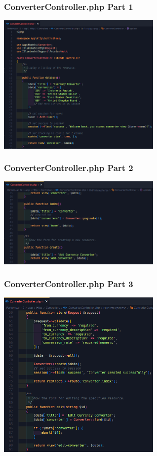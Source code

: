 \documentclass[aspectratio=169, table]{beamer}
\begin{document}
\begin{frame}[fragile]
 \frametitle{ConverterController.php Part 1}
 \vskip1cm
 \begin{center}
  \includegraphics[width=0.6\textwidth]{classFiles/pertemuan-12-controller-part-1.png}
 \end{center}
\end{frame}

\begin{frame}[fragile]
 \frametitle{ConverterController.php Part 2}
 \vskip1cm
 \begin{center}
  \includegraphics[width=0.6\textwidth]{classFiles/pertemuan-12-controller-part-2.png}
 \end{center}
\end{frame}

\begin{frame}[fragile]
 \frametitle{ConverterController.php Part 3}
 \vskip1cm
 \begin{center}
  \includegraphics[width=0.6\textwidth]{classFiles/pertemuan-12-controller-part-3.png}
 \end{center}
\end{frame}
\end{document}
